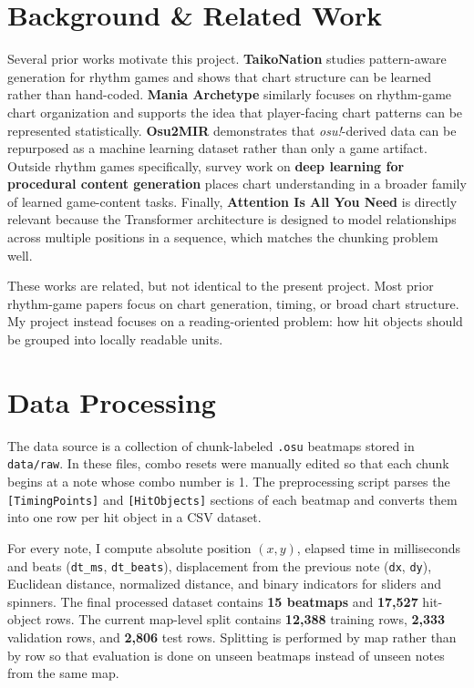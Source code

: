 \documentclass[final]{article}
\begin{document}
\section*{Background \& Related Work}
Several prior works motivate this project. \textbf{TaikoNation} studies pattern-aware generation for rhythm games and shows that chart structure can be learned rather than hand-coded. \textbf{Mania Archetype} similarly focuses on rhythm-game chart organization and supports the idea that player-facing chart patterns can be represented statistically. \textbf{Osu2MIR} demonstrates that \textit{osu!}-derived data can be repurposed as a machine learning dataset rather than only a game artifact. Outside rhythm games specifically, survey work on \textbf{deep learning for procedural content generation} places chart understanding in a broader family of learned game-content tasks. Finally, \textbf{Attention Is All You Need} is directly relevant because the Transformer architecture is designed to model relationships across multiple positions in a sequence, which matches the chunking problem well.

These works are related, but not identical to the present project. Most prior rhythm-game papers focus on chart generation, timing, or broad chart structure. My project instead focuses on a reading-oriented problem: how hit objects should be grouped into locally readable units.

\section*{Data Processing}
The data source is a collection of chunk-labeled \texttt{.osu} beatmaps stored in \texttt{data/raw}. In these files, combo resets were manually edited so that each chunk begins at a note whose combo number is 1. The preprocessing script parses the \texttt{[TimingPoints]} and \texttt{[HitObjects]} sections of each beatmap and converts them into one row per hit object in a CSV dataset.

For every note, I compute absolute position \((x,y)\), elapsed time in milliseconds and beats (\texttt{dt\_ms}, \texttt{dt\_beats}), displacement from the previous note (\texttt{dx}, \texttt{dy}), Euclidean distance, normalized distance, and binary indicators for sliders and spinners. The final processed dataset contains \textbf{15 beatmaps} and \textbf{17{,}527} hit-object rows. The current map-level split contains \textbf{12{,}388} training rows, \textbf{2{,}333} validation rows, and \textbf{2{,}806} test rows. Splitting is performed by map rather than by row so that evaluation is done on unseen beatmaps instead of unseen notes from the same map.
\end{document}
